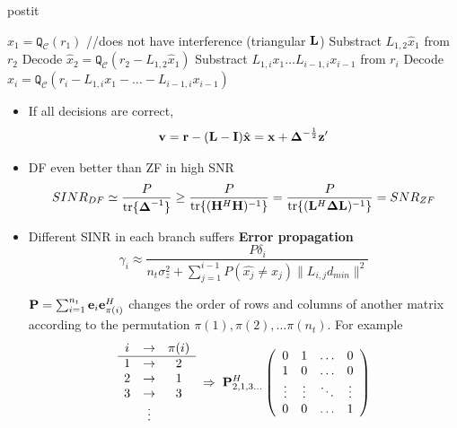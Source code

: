 \documentclass[xcolor=dvipsnames,aspectratio=169]{beamer}
\begin{document}
{        \pagebreak

    \begin{beamercolorbox}[wd=\textwidth]{postit}
     \begin{algorithmic}[0]
        \STATE $\hat{x}_1=\texttt{Q}_{\mathcal{C}}(r_1)$ //does not have interference (triangular $\mathbf{L}$)
        \STATE Substract $L_{1,2}\hat{x}_1$ from $r_2$ 
        \STATE Decode $\hat{x}_2=\texttt{Q}_{\mathcal{C}}(r_2-L_{1,2}\hat{x}_1)$
        \STATE Substract $L_{1,i}x_1\dots L_{i-1,i}x_{i-1}$ from $r_i$
        \STATE Decode $\hat{x}_i=\texttt{Q}_{\mathcal{C}}(r_i-L_{1,i}x_1-\dots - L_{i-1,i}x_{i-1})$
        \ENDFOR
     \end{algorithmic}
     \end{beamercolorbox}
     \begin{itemize}
      \item If all decisions are correct, 
         $$\mathbf{v}=\mathbf{r}-(\mathbf{L}-\mathbf{I})\hat{\mathbf{x}}=\mathbf{x}+\mathbf{\boldsymbol{\Delta}}^{-\frac{1}{2}}\mathbf{z}'$$
        \item DF even better than ZF in high SNR
            $$SINR_{DF}\simeq \frac{P}{\textnormal{tr}\{\mathbf{\boldsymbol{\Delta}}^{-1}\}}\geq\frac{P}{\textnormal{tr}\{(\mathbf{H}^H\mathbf{H})^{-1}\}}=\frac{P}{\textnormal{tr}\{(\mathbf{L}^H\mathbf{\boldsymbol{\Delta}}\mathbf{L})^{-1}\}}=SNR_{ZF}$$
     \end{itemize}

\pagebreak

\begin{itemize}
 \item Different SINR in each branch suffers \textbf{Error propagation}
 $$\gamma_i\approx\frac{P\delta_i}{n_t\sigma_z^2+\sum_{j=1}^{i-1}P(\hat{x_j}\neq x_j)\|L_{i,j}d_{min}\|^2}$$
 \begin{definition}
  $\mathbf{P}=\sum_{i=1}^{n_t}\mathbf{e}_i\mathbf{e}_{\pi(i)}^H$ changes the order of rows and columns of another matrix according to the permutation $\pi(1),\pi(2),\dots \pi(n_t)$. For example
   $$\begin{array}{ccc}i&\to&\pi(i)\\\hline
      1&\to&2\\
      2&\to&1\\
      3&\to&3\\
      &\vdots&\\
     \end{array}\;\Rightarrow\;
\mathbf{P}_{2,1,3\dots}^H\left(\begin{array}{cccc}
             0 & 1 & \dots & 0\\
             1 & 0 & \dots & 0\\
             \vdots & \vdots & \ddots & \vdots\\
             0 & 0 & \dots & 1\\
            \end{array}\right)$$
 \end{definition}
\end{itemize}

}
\end{document}
